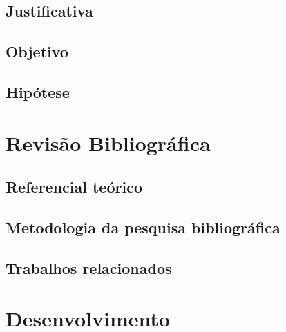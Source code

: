\documentclass[
    12pt,                %
    openright,           %
    oneside,             %
    a4paper,             %
    english,             %
    brazil,               %
]{abntex2}
\begin{document}
\section{Justificativa}
\label{sec:justificativa}


\section{Objetivo}
\label{sec:objetivo}


\section{Hipótese}
\label{sec:hipotese}


\chapter{Revisão Bibliográfica}
\label{cap:revisao}

\section{Referencial teórico}
\label{sec:referencial}


\section{Metodologia da pesquisa bibliográfica}
\label{sec:metodologia_pesquisa}


\section{Trabalhos relacionados}
\label{sec:trabalhos_relacionados}


\chapter{Desenvolvimento}
\label{cap:desenvolvimento}

\end{document}
